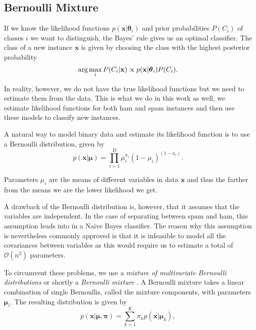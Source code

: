 \subsection{Bernoulli Mixture}

If we know the likelihood functions $p(\mathbf{x}|\boldsymbol\theta_i)$
and prior probabilities $P(C_i)$ of classes $i$ we want to distinguish,
the Bayes' rule gives us an optimal classifier. The class of a new
instance $\mathbf{x}$ is given by choosing the class with the highest
posterior probability
\begin{equation}
 \textmd{arg}\max_i P(C_i|\mathbf{x}) \propto p(\mathbf{x}|\boldsymbol\theta_i)P(C_i).
\end{equation}

In reality, however, we do not have the true likelihood functions but
we need to estimate them from the data. This is what we do in this work
as well, we estimate likelihood functions for both ham and spam
instances and then use these models to classify new instances.

A natural way to model binary data and estimate its likelihood function
is to use a Bernoulli distribution, given by
\begin{equation}
  p(\mathbf{x}|\boldsymbol\mu) = \prod_{i=1}^D \mu_i^{x_i}(1-\mu_i)^{(1-x_i)}.
\end{equation}

Parameters $\mu_i$ are the means of different variables in data
$\mathbf{x}$ and thus the farther from the means we are the lower
likelihood we get.

A drawback of the Bernoulli distribution is, however, that it assumes
that the variables are independent. In the case of separating between spam
and ham, this assumption leads into in a Naive Bayes classifier. The
reason why this assumption is nevertheless commonly approved is that it
is infeasible to model all the covariances between variables as this
would require us to estimate a total of $\mathcal{O}(n^2)$ parameters.

To circumvent these problems, we use a
\emph{mixture of multivariate Bernoulli distributions} or shortly a
\emph{Bernoulli mixture} \cite{lazarsfeld1968latent}. A Bernoulli
mixture takes a linear combination of single Bernoullis, called the
mixture components, with parameters $\boldsymbol\mu_i$. The resulting
distribution is given by
\begin{equation}
 p(\mathbf{x}|\boldsymbol\mu,\boldsymbol\pi) = \sum_{k=1}^K \pi_kp(\mathbf{x}|\boldsymbol\mu_k),
\end{equation}


